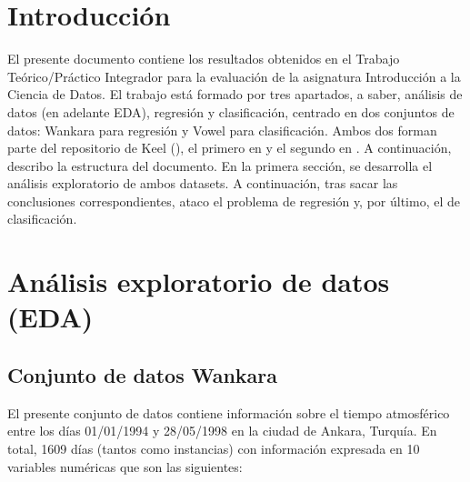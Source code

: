 
\section{Introducción}


El presente documento contiene los resultados obtenidos en el Trabajo Teórico/Práctico Integrador para la evaluación de la asignatura Introducción a la Ciencia de Datos. El trabajo está formado por tres apartados, a saber, análisis de datos (en adelante EDA), regresión y clasificación, centrado en dos conjuntos de datos: Wankara para regresión y Vowel para clasificación. Ambos dos forman parte del repositorio de Keel (\cite{keel}), el primero en \cite{wankara} y el segundo en \cite{vowel}. A continuación, describo la estructura del documento. En la primera sección, se desarrolla el análisis exploratorio de ambos datasets. A continuación, tras sacar las conclusiones correspondientes, ataco el problema de regresión y, por último, el de clasificación.







\section{Análisis exploratorio de datos (EDA)}

\subsection{Conjunto de datos Wankara}

El presente conjunto de datos contiene información sobre el tiempo atmosférico entre los días 01/01/1994 y 28/05/1998 en la ciudad de Ankara, Turquía. En total, 1609 días (tantos como instancias) con información expresada en 10 variables numéricas que son las siguientes:

